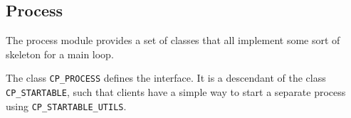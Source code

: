 % 
% 
%   
%     
%   
% 
%     
% 
% 
% 
% 
% 


\subsection{Process}

The process module provides a set of classes that all implement some sort of skeleton for a main loop.

The class \lstinline!CP_PROCESS! defines the interface.
It is a descendant of the class \lstinline!CP_STARTABLE!, such that clients have a simple way to start a separate process using \lstinline!CP_STARTABLE_UTILS!.

